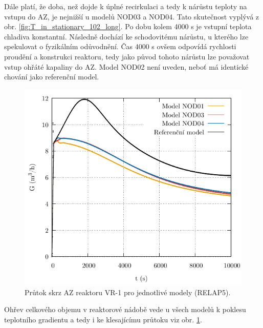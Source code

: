 Dále platí, že doba, než dojde k úplné recirkulaci a tedy k nárůstu teploty na vstupu do AZ, je nejnižší u modelů NOD03 a NOD04. Tato skutečnost vyplývá z obr. \ref{fig:T_in_stationary_102_long}. Po dobu kolem 4000 s je vstupní teplota chladiva konstantní. Následně dochází ke schodovitému nárůstu, u kterého lze spekulovat o fyzikálním odůvodnění. Čas 4000 s ovšem odpovídá rychlosti proudění a konstrukci reaktoru, tedy jako původ tohoto nárůstu lze považovat vstup ohřáté kapaliny do AZ. Model NOD02 není uveden, neboť má identické chování jako referenční model.

\begin{figure}[H]
 	\centering
 	\begin{minipage}{.5\textwidth}
 		\centering
 		\includegraphics[width=\textwidth]{./06_hodnoceni_TH_modelu/grafy/G_stationary_100_long.pdf}
 		
 	\end{minipage}%
 	
 	\caption{Průtok skrz AZ reaktoru VR-1 pro jednotlivé modely (RELAP5).}
 	\label{fig:G_stationary_100_long}
\end{figure}

Ohřev celkového objemu v reaktorové nádobě vede u všech modelů k poklesu teplotního gradientu a tedy i ke klesajícímu průtoku viz obr. \ref{fig:G_stationary_100_long}. 



